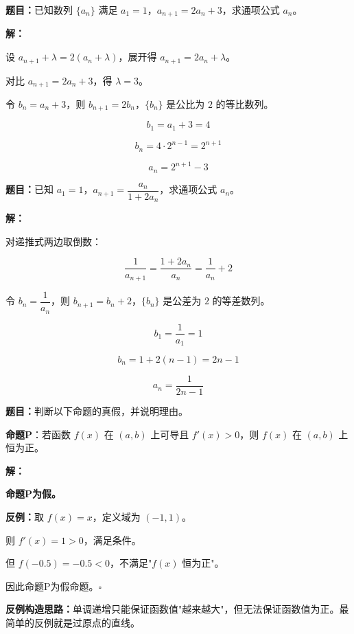 \documentclass[12pt, a4paper]{ctexart}
\begin{document}
\begin{examplebox}[【例题3】构造辅助数列求通项]
\textbf{题目：}已知数列 $\{a_n\}$ 满足 $a_1 = 1$，$a_{n+1} = 2a_n + 3$，求通项公式 $a_n$。

\medskip
\textbf{解：}

设 $a_{n+1} + \lambda = 2(a_n + \lambda)$，展开得 $a_{n+1} = 2a_n + \lambda$。

对比 $a_{n+1} = 2a_n + 3$，得 $\lambda = 3$。

令 $b_n = a_n + 3$，则 $b_{n+1} = 2b_n$，$\{b_n\}$ 是公比为 $2$ 的等比数列。

$$b_1 = a_1 + 3 = 4$$

$$b_n = 4 \cdot 2^{n-1} = 2^{n+1}$$

$$\boxed{a_n = 2^{n+1} - 3}$$
\end{examplebox}

\begin{examplebox}[【例题4】取倒数构造化简递推]
\textbf{题目：}已知 $a_1 = 1$，$a_{n+1} = \dfrac{a_n}{1 + 2a_n}$，求通项公式 $a_n$。

\medskip
\textbf{解：}

对递推式两边取倒数：

$$\frac{1}{a_{n+1}} = \frac{1 + 2a_n}{a_n} = \frac{1}{a_n} + 2$$

令 $b_n = \dfrac{1}{a_n}$，则 $b_{n+1} = b_n + 2$，$\{b_n\}$ 是公差为 $2$ 的等差数列。

$$b_1 = \frac{1}{a_1} = 1$$

$$b_n = 1 + 2(n-1) = 2n - 1$$

$$\boxed{a_n = \frac{1}{2n-1}}$$
\end{examplebox}

\begin{examplebox}[【例题5】构造反例否定命题]
\textbf{题目：}判断以下命题的真假，并说明理由。

\textbf{命题P}：若函数 $f(x)$ 在 $(a,b)$ 上可导且 $f'(x) > 0$，则 $f(x)$ 在 $(a,b)$ 上恒为正。

\medskip
\textbf{解：}

\textbf{命题P为假。}

\textbf{反例：}取 $f(x) = x$，定义域为 $(-1, 1)$。

则 $f'(x) = 1 > 0$，满足条件。

但 $f(-0.5) = -0.5 < 0$，不满足"$f(x)$ 恒为正"。

因此命题P为假命题。\hfill$\square$

\medskip
\textbf{反例构造思路：}单调递增只能保证函数值"越来越大"，但无法保证函数值为正。最简单的反例就是过原点的直线。
\end{examplebox}
\end{document}
